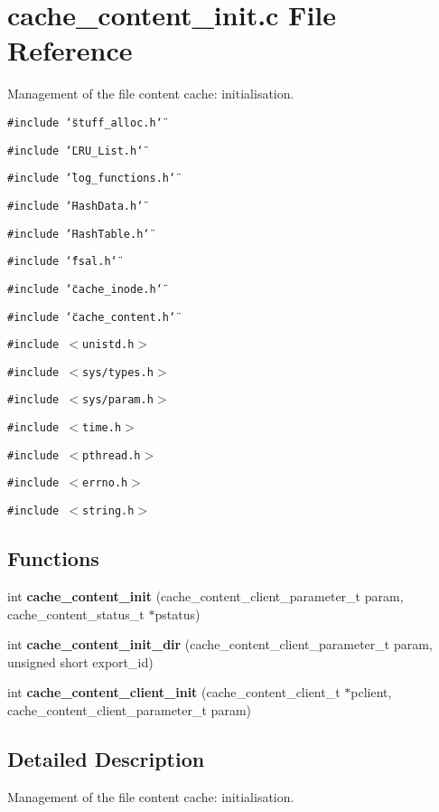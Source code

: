 \section{cache\_\-content\_\-init.c File Reference}
\label{cache__content__init_8c}
Management of the file content cache: initialisation.  


{\tt \#include \char`\"{}stuff\_\-alloc.h\char`\"{}}\par
{\tt \#include \char`\"{}LRU\_\-List.h\char`\"{}}\par
{\tt \#include \char`\"{}log\_\-functions.h\char`\"{}}\par
{\tt \#include \char`\"{}HashData.h\char`\"{}}\par
{\tt \#include \char`\"{}HashTable.h\char`\"{}}\par
{\tt \#include \char`\"{}fsal.h\char`\"{}}\par
{\tt \#include \char`\"{}cache\_\-inode.h\char`\"{}}\par
{\tt \#include \char`\"{}cache\_\-content.h\char`\"{}}\par
{\tt \#include $<$unistd.h$>$}\par
{\tt \#include $<$sys/types.h$>$}\par
{\tt \#include $<$sys/param.h$>$}\par
{\tt \#include $<$time.h$>$}\par
{\tt \#include $<$pthread.h$>$}\par
{\tt \#include $<$errno.h$>$}\par
{\tt \#include $<$string.h$>$}\par
\subsection*{Functions}
\begin{CompactItemize}
\item 
int {\bf cache\_\-content\_\-init} (cache\_\-content\_\-client\_\-parameter\_\-t param, cache\_\-content\_\-status\_\-t $\ast$pstatus)
\item 
int {\bf cache\_\-content\_\-init\_\-dir} (cache\_\-content\_\-client\_\-parameter\_\-t param, unsigned short export\_\-id)
\item 
int {\bf cache\_\-content\_\-client\_\-init} (cache\_\-content\_\-client\_\-t $\ast$pclient, cache\_\-content\_\-client\_\-parameter\_\-t param)
\end{CompactItemize}


\subsection{Detailed Description}
Management of the file content cache: initialisation. 

